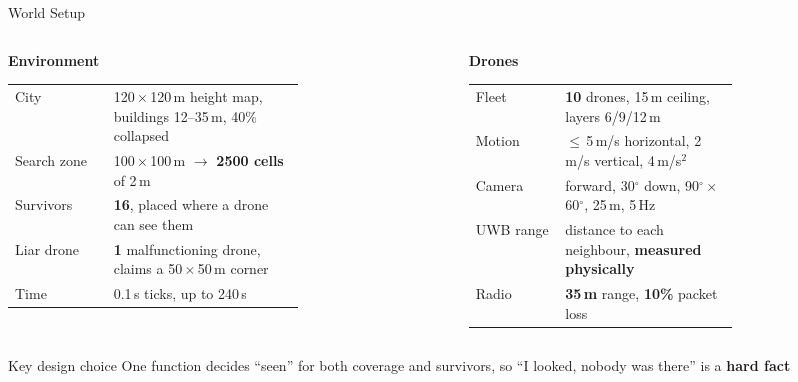 \documentclass[aspectratio=169,10pt]{beamer}
\begin{document}
\begin{frame}{World Setup}
\begin{columns}[T]
\begin{column}{0.48\textwidth}
\textbf{\color{primary}Environment}\\[0.3em]
\small
\renewcommand{\arraystretch}{1.3}
\begin{tabular}{@{}l p{0.66\linewidth}@{}}
\toprule
City        & 120\,$\times$\,120\,m height map, buildings 12--35\,m, 40\% collapsed \\
Search zone & 100\,$\times$\,100\,m $\rightarrow$ \textbf{2500 cells} of 2\,m \\
Survivors   & \textbf{16}, placed where a drone can see them \\
Liar drone  & \textbf{1} malfunctioning drone, claims a 50\,$\times$\,50\,m corner \\
Time        & 0.1\,s ticks, up to 240\,s \\
\bottomrule
\end{tabular}
\end{column}
\begin{column}{0.48\textwidth}
\textbf{\color{primary}Drones}\\[0.3em]
\small
\renewcommand{\arraystretch}{1.3}
\begin{tabular}{@{}l p{0.66\linewidth}@{}}
\toprule
Fleet     & \textbf{10} drones, 15\,m ceiling, layers 6/9/12\,m \\
Motion    & $\le$\,5\,m/s horizontal, 2\,m/s vertical, 4\,m/s$^2$ \\
Camera    & forward, 30$^\circ$ down, 90$^\circ\times$60$^\circ$, 25\,m, 5\,Hz \\
UWB range & distance to each neighbour, \textbf{measured physically} \\
Radio     & \textbf{35\,m} range, \textbf{10\%} packet loss \\
\bottomrule
\end{tabular}
\end{column}
\end{columns}

\vspace{1.2em}
\begin{block}{Key design choice}
\centering One function decides ``seen'' for both coverage and survivors, so ``I looked, nobody was there'' is a \textbf{hard fact}
\end{block}
\end{frame}
\end{document}
